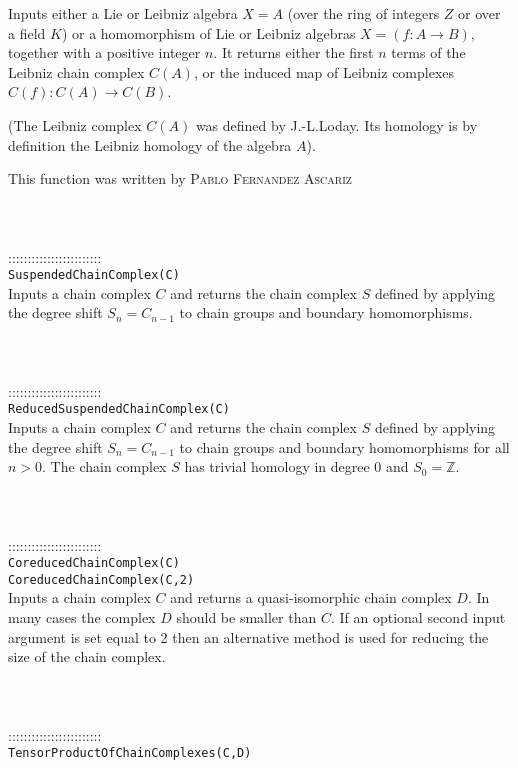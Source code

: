 \documentclass[a4paper,11pt]{report}
\begin{document}
{ Inputs either a Lie or Leibniz algebra $X=A$ (over the ring of integers $Z$ or over a field $K$) or a homomorphism of Lie or Leibniz algebras $X=(f:A \longrightarrow B)$, together with a positive integer $n$. It returns either the first $n$ terms of the Leibniz chain complex $C(A)$, or the induced map of Leibniz complexes $C(f):C(A) \longrightarrow C(B)$. 

 (The Leibniz complex $C(A)$ was defined by J.-L.Loday. Its homology is by definition the Leibniz homology
of the algebra $A$). 

 This function was written by \textsc{Pablo Fernandez Ascariz} \\
 \\
 \\
 \\
 ::::::::::::::::::::::::\\
 \texttt{SuspendedChainComplex(C)}\\
 

 Inputs a chain complex $C$ and returns the chain complex $S$ defined by applying the degree shift $S_n = C_{n-1}$ to chain groups and boundary homomorphisms. \\
 \\
 \\
 \\
 ::::::::::::::::::::::::\\
 \texttt{ReducedSuspendedChainComplex(C)}\\
 

 Inputs a chain complex $C$ and returns the chain complex $S$ defined by applying the degree shift $S_n = C_{n-1}$ to chain groups and boundary homomorphisms for all $n > 0$. The chain complex $S$ has trivial homology in degree $0$ and $S_0=\mathbb Z$. \\
 \\
 \\
 \\
 ::::::::::::::::::::::::\\
 \texttt{CoreducedChainComplex(C)}\\
 \texttt{CoreducedChainComplex(C,2)}\\
 

 Inputs a chain complex $C$ and returns a quasi-isomorphic chain complex $D$. In many cases the complex $D$ should be smaller than $C$. If an optional second input argument is set equal to 2 then an alternative
method is used for reducing the size of the chain complex. \\
 \\
 \\
 \\
 ::::::::::::::::::::::::\\
 \texttt{TensorProductOfChainComplexes(C,D)}\\
 

}
\end{document}
